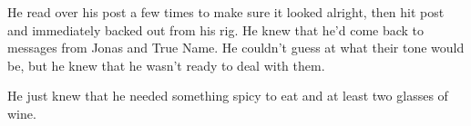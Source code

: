 \noindent He read over his post a few times to make sure it looked alright, then hit post and immediately backed out from his rig. He knew that he'd come back to messages from Jonas and True Name. He couldn't guess at what their tone would be, but he knew that he wasn't ready to deal with them.

He just knew that he needed something spicy to eat and at least two glasses of wine.
